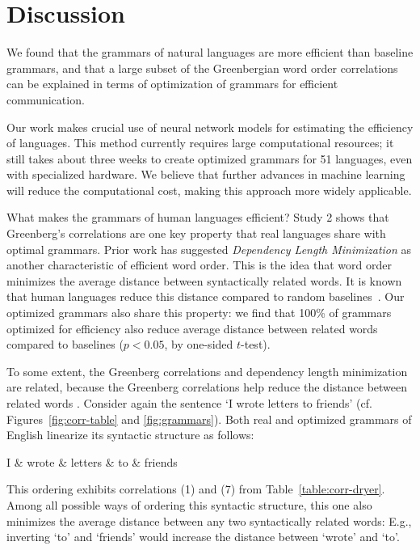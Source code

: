 \documentclass[9pt,twocolumn,twoside,lineno]{pnas-new}
\begin{document}
\section*{Discussion}

We found that the grammars of natural languages are more efficient than baseline grammars, and that a large subset of the Greenbergian word order correlations can be explained in terms of optimization of grammars for efficient communication. 

Our work makes crucial use of neural network models for estimating the efficiency of languages.
This method currently requires large computational resources; it still takes about three weeks to create optimized grammars for 51 languages, even with specialized hardware.
We believe that further advances in machine learning will reduce the computational cost, making this approach more widely applicable.


What makes the grammars of human languages efficient?
Study 2 shows that Greenberg's correlations are one key property that real languages share with optimal grammars.
Prior work has suggested \emph{Dependency Length Minimization} as another characteristic of efficient word order.
This is the idea that word order minimizes the average distance between syntactically related words.
It is known that human languages reduce this distance compared to random baselines~\cite{liu2008dependency,futrell2015largescale,liu2017dependency,temperley2018minimizing}.
Our optimized grammars also share this property: we find that 100\% of grammars optimized for efficiency also reduce average distance between related words compared to baselines ($p < 0.05$, by one-sided $t$-test).

To some extent, the Greenberg correlations and dependency length minimization are related, because the Greenberg correlations help reduce the distance between related words \citep{hawkins1994performance,temperley2008dependency}. Consider again the sentence `I wrote letters to friends' (cf. Figures~\ref{fig:corr-table} and \ref{fig:grammars}). Both real and optimized grammars of English linearize its syntactic structure as follows:
\begin{center}
\begin{dependency}[theme = simple]
   \begin{deptext}[column sep=1em]
          I \& wrote \& letters \& to \& friends  \\
   \end{deptext}
\end{dependency}
\end{center}
This ordering exhibits correlations (1) and (7) from Table~\ref{table:corr-dryer}.
Among all possible ways of ordering this syntactic structure, this one also minimizes the average distance between any two syntactically related words: E.g., inverting `to' and `friends' would increase the distance between `wrote' and `to'.
\end{document}
